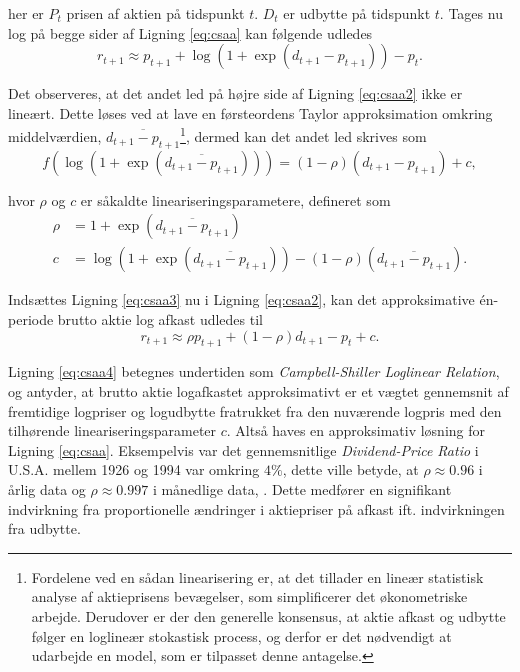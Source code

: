 \documentclass[
  a4paper,
  oneside]{memoir}
\begin{document}
her er \(P_t\) prisen af aktien på tidspunkt \(t\). \(D_t\) er udbytte på tidspunkt \(t\). Tages nu log på begge sider af Ligning \eqref{eq:csaa} kan følgende udledes
\begin{equation}
r_{t+1}\approx p_{t+1}+\log\left(1+\exp\left(d_{t+1}-p_{t+1}\right)\right)-p_t. \label{eq:csaa2}
\end{equation}

Det observeres, at det andet led på højre side af Ligning \eqref{eq:csaa2} ikke er lineært. Dette løses ved at lave en førsteordens Taylor approksimation omkring middelværdien, \(\overline{d_{t+1}-p_{t+1}}\)\footnote{Fordelene ved en sådan linearisering er, at det tillader en lineær statistisk analyse af aktieprisens bevægelser, som simplificerer det økonometriske arbejde. Derudover er der den generelle konsensus, at aktie afkast og udbytte følger en loglineær stokastisk process, og derfor er det nødvendigt at udarbejde en model, som er tilpasset denne antagelse.}, dermed kan det andet led skrives som
\begin{equation}
f\left(\log\left(1+\exp\left(\overline{d_{t+1}-p_{t+1}}\right)\right)\right) = (1-\rho)(d_{t+1}-p_{t+1}) + c, \label{eq:csaa3}
\end{equation}

hvor \(\rho\) og \(c\) er såkaldte lineariseringsparametere, defineret som
\begin{align*}
\rho&=1+\exp\left(\overline{d_{t+1}-p_{t+1}}\right)\\
c&=\log\left(1+\exp\left(\overline{d_{t+1}-p_{t+1}}\right)\right)-(1-\rho)(\overline{d_{t+1}-p_{t+1}}).
\end{align*}

Indsættes Ligning \eqref{eq:csaa3} nu i Ligning \eqref{eq:csaa2}, kan det approksimative én-periode brutto aktie log afkast udledes til
\begin{equation}
r_{t+1}\approx \rho p_{t+1} + (1-\rho)d_{t+1}-p_t+c. \label{eq:csaa4}
\end{equation}

Ligning \eqref{eq:csaa4} betegnes undertiden som \emph{Campbell-Shiller Loglinear Relation}, og antyder, at brutto aktie logafkastet approksimativt er et vægtet gennemsnit af fremtidige logpriser og logudbytte fratrukket fra den nuværende logpris med den tilhørende lineariseringsparameter \(c\). Altså haves en approksimativ løsning for Ligning \eqref{eq:csaa}. Eksempelvis var det gennemsnitlige \emph{Dividend-Price Ratio} i U.S.A. mellem 1926 og 1994 var omkring \(4\%\), dette ville betyde, at \(\rho\approx 0.96\) i årlig data og \(\rho\approx 0.997\) i månedlige data, \citep{Campbell1997}. Dette medfører en signifikant indvirkning fra proportionelle ændringer i aktiepriser på afkast ift. indvirkningen fra udbytte.
\end{document}
